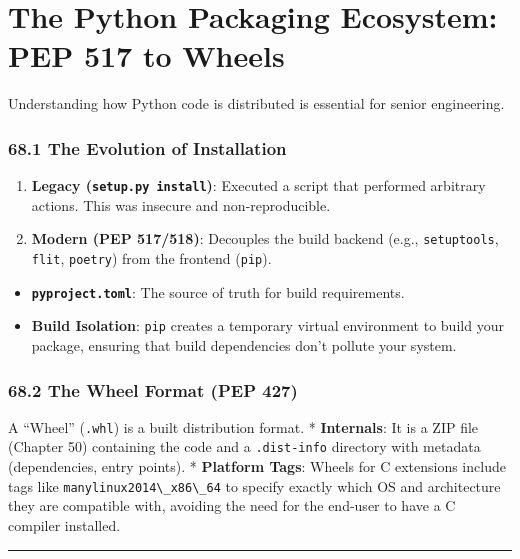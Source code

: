 \hypertarget{the-python-packaging-ecosystem-pep-517-to-wheels}{%
\chapter{The Python Packaging Ecosystem: PEP 517 to
Wheels}\label{the-python-packaging-ecosystem-pep-517-to-wheels}}

Understanding how Python code is distributed is essential for senior
engineering.

\hypertarget{the-evolution-of-installation}{%
\subsection{68.1 The Evolution of
Installation}\label{the-evolution-of-installation}}

\begin{enumerate}
\def\labelenumi{\arabic{enumi}.}
\tightlist
\item
  \textbf{Legacy (\passthrough{\lstinline!setup.py install!})}: Executed
  a script that performed arbitrary actions. This was insecure and
  non-reproducible.
\item
  \textbf{Modern (PEP 517/518)}: Decouples the build backend (e.g.,
  \passthrough{\lstinline!setuptools!}, \passthrough{\lstinline!flit!},
  \passthrough{\lstinline!poetry!}) from the frontend
  (\passthrough{\lstinline!pip!}).
\end{enumerate}

\begin{itemize}
\tightlist
\item
  \textbf{\passthrough{\lstinline!pyproject.toml!}}: The source of truth
  for build requirements.
\item
  \textbf{Build Isolation}: \passthrough{\lstinline!pip!} creates a
  temporary virtual environment to build your package, ensuring that
  build dependencies don't pollute your system.
\end{itemize}

\hypertarget{the-wheel-format-pep-427}{%
\subsection{68.2 The Wheel Format (PEP
427)}\label{the-wheel-format-pep-427}}

A ``Wheel'' (\passthrough{\lstinline!.whl!}) is a built distribution
format. * \textbf{Internals}: It is a ZIP file (Chapter 50) containing
the code and a \passthrough{\lstinline!.dist-info!} directory with
metadata (dependencies, entry points). * \textbf{Platform Tags}: Wheels
for C extensions include tags like
\passthrough{\lstinline!manylinux2014\_x86\_64!} to specify exactly
which OS and architecture they are compatible with, avoiding the need
for the end-user to have a C compiler installed.

\begin{center}\rule{0.5\linewidth}{0.5pt}\end{center}
